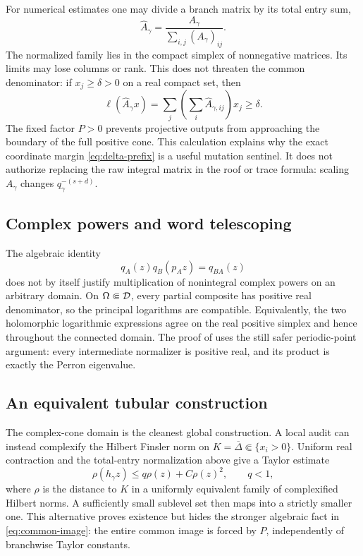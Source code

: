 For numerical estimates one may divide a branch matrix by its total entry
sum,
\[
 \widehat A_\gamma
 =\frac{A_\gamma}{\sum_{i,j}(A_\gamma)_{ij}}.
\]
The normalized family lies in the compact simplex of nonnegative matrices.
Its limits may lose columns or rank.  This does not threaten the common
denominator: if \(x_j\geq\delta>0\) on a real compact set, then
\[
 \ell(\widehat A_\gamma x)
 =\sum_j\left(\sum_i\widehat A_{\gamma,ij}\right)x_j
 \geq\delta.
\]
The fixed factor \(P>0\) prevents projective outputs from approaching the
boundary of the full positive cone.  This calculation explains why the
exact coordinate margin \eqref{eq:delta-prefix} is a useful mutation
sentinel.  It does not authorize replacing the raw integral matrix in the
roof or trace formula: scaling \(A_\gamma\) changes
\(q_\gamma^{-(s+d)}\).

\subsection{Complex powers and word telescoping}

The algebraic identity
\[
 q_A(z)q_B(p_Az)=q_{BA}(z)
\]
does not by itself justify multiplication of nonintegral complex powers on
an arbitrary domain.  On \(\Omega\Subset\mathcal{D}\), every partial composite has
positive real denominator, so the principal logarithms are compatible.
Equivalently, the two holomorphic logarithmic expressions agree on the real
positive simplex and hence throughout the connected domain.  The proof of
 uses the still safer periodic-point argument: every
intermediate normalizer is positive real, and its product is exactly the
Perron eigenvalue.

\subsection{An equivalent tubular construction}

The complex-cone domain is the cleanest global construction.  A local audit
can instead complexify the Hilbert Finsler norm on
\(K=\overline\Delta\Subset\{x_i>0\}\).  Uniform real contraction and the
total-entry normalization above give a Taylor estimate
\[
 \rho(h_\gamma z)
 \leq q\rho(z)+C\rho(z)^2,
 \qquad q<1,
\]
where \(\rho\) is the distance to \(K\) in a uniformly equivalent family of
complexified Hilbert norms.  A sufficiently small sublevel set then maps
into a strictly smaller one.  This alternative proves existence but hides
the stronger algebraic fact in \eqref{eq:common-image}: the entire common
image is forced by \(P\), independently of branchwise Taylor constants.
